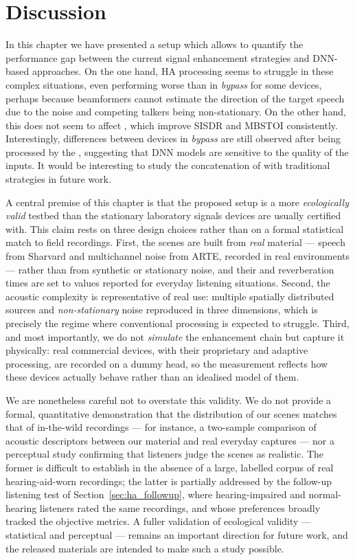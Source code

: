 \section{Discussion}
\label{sec:ha_discussion}

In this chapter we have presented a setup which allows to quantify the performance gap between the current  signal enhancement strategies and DNN-based approaches. On the one hand, HA processing seems to struggle in these complex situations, even performing worse than in \textit{bypass} for some devices, perhaps because beamformers cannot estimate the direction of the target speech due to the noise and competing talkers being non-stationary. On the other hand, this does not seem to affect , which improve SISDR and MBSTOI consistently. Interestingly, differences between devices in \textit{bypass} are still observed after being processed by the , suggesting that DNN models are sensitive to the quality of the inputs. It would be interesting to study the concatenation of  with traditional  strategies in future work.

A central premise of this chapter is that the proposed setup is a more
\emph{ecologically valid} testbed than the stationary laboratory signals devices
are usually certified with. This claim rests on three design choices rather than
on a formal statistical match to field recordings. First, the scenes are built
from \emph{real} material --- speech from Sharvard and multichannel noise from
ARTE, recorded in real environments --- rather than from synthetic or stationary
noise, and their  and reverberation times are set to values
reported for everyday listening situations. Second, the acoustic complexity is
representative of real use: multiple spatially distributed sources and
\emph{non-stationary} noise reproduced in three dimensions, which is precisely
the regime where conventional processing is expected to struggle. Third, and most
importantly, we do not \emph{simulate} the enhancement chain but capture it
physically: real commercial devices, with their proprietary and adaptive
processing, are recorded on a dummy head, so the measurement reflects how these
devices actually behave rather than an idealised model of them.

We are nonetheless careful not to overstate this validity. We do not provide a
formal, quantitative demonstration that the distribution of our scenes matches
that of in-the-wild recordings --- for instance, a two-sample comparison of
acoustic descriptors between our material and real everyday captures --- nor a
perceptual study confirming that listeners judge the scenes as realistic. The
former is difficult to establish in the absence of a large, labelled corpus of
real hearing-aid-worn recordings; the latter is partially addressed by the
follow-up listening test of Section~\ref{sec:ha_followup}, where
hearing-impaired and normal-hearing listeners rated the same recordings, and
whose preferences broadly tracked the objective metrics. A fuller validation of
ecological validity --- statistical and perceptual --- remains an important
direction for future work, and the released materials are intended to make such a
study possible.

